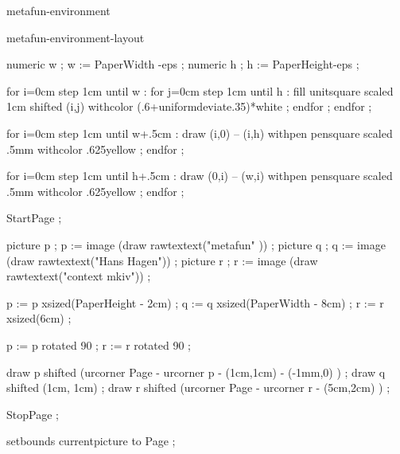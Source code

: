 %

\startenvironment metafun-environment

\environment metafun-environment-layout



    numeric w ; w := PaperWidth -eps ; %
    numeric h ; h := PaperHeight-eps ; %

    for i=0cm step 1cm until w  :
        for j=0cm step 1cm until h :
            fill unitsquare scaled 1cm shifted (i,j) withcolor (.6+uniformdeviate.35)*white ;
        endfor ;
    endfor ;


    for i=0cm step 1cm until w+.5cm :
        draw (i,0) -- (i,h) withpen pensquare scaled .5mm withcolor .625yellow ;
    endfor ;

    for i=0cm step 1cm until h+.5cm :
        draw (0,i) -- (w,i) withpen pensquare scaled .5mm withcolor .625yellow ;
    endfor ;

\stopuseMPgraphic


    StartPage ;


        picture p ; p := image (draw rawtextext("\darkred{}metafun"   )) ;
        picture q ; q := image (draw rawtextext("\darkred{}Hans Hagen")) ;
        picture r ; r := image (draw rawtextext("\darkred{}context mkiv")) ;

        p := p xsized(PaperHeight - 2cm) ;
        q := q xsized(PaperWidth  - 8cm) ;
        r := r xsized(6cm) ;

        p := p rotated 90 ;
        r := r rotated 90 ;

        draw p shifted (urcorner Page - urcorner p - (1cm,1cm) - (-1mm,0) ) ;
        draw q shifted (1cm, 1cm) ;
        draw r shifted (urcorner Page - urcorner r - (5cm,2cm) ) ;

    StopPage ;

    setbounds currentpicture to Page ;

\stopuseMPgraphic

